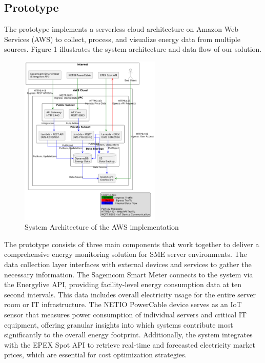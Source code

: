 \subsection{Prototype}
The prototype implements a serverless cloud architecture on Amazon Web Services (AWS) to collect,
process, and visualize energy data from multiple sources. Figure 1 illustrates the system
architecture and data flow of our solution.

\begin{figure}[htbp]
    \centering
    \includegraphics[width=0.6\textwidth]{fig/architecture2.png}
    \caption{System Architecture of the AWS implementation}
    \label{fig:architecture}
\end{figure}

The prototype consists of three main components that work together to deliver a comprehensive
energy monitoring solution for SME server environments. The data collection layer interfaces with
external devices and services to gather the necessary information. The Sagemcom Smart Meter
connects to the system via the Energylive API, providing facility-level energy consumption data at
ten second intervals. This data includes overall electricity usage for the entire server room or IT
infrastructure. The NETIO PowerCable device serves as an IoT sensor that measures power consumption
of individual servers and critical IT equipment, offering granular insights into which systems
contribute most significantly to the overall energy footprint. Additionally, the system integrates
with the EPEX Spot API to retrieve real-time and forecasted electricity market prices, which
are essential for cost optimization strategies.

